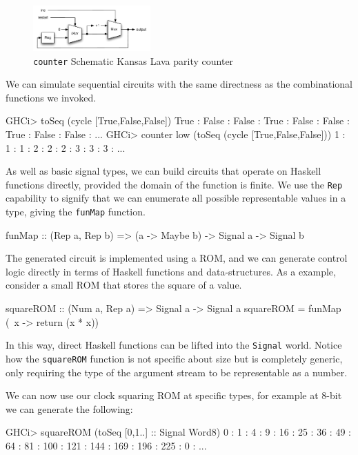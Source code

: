 \documentclass[11pt]{article}
\begin{document}
\begin{figure}[!t]
  \centering         
    \includegraphics[width=0.4\textwidth]{images/Counter.pdf}
  \caption{{\tt counter} Schematic Kansas Lava parity counter}
  \label{fig:counter-picture}
\end{figure}


We can simulate sequential circuits with the
same directness as the combinational functions we invoked.
\begin{Code}
GHCi> toSeq (cycle [True,False,False])
True : False : False : True : False : False : True : False : False : ...
GHCi> counter low (toSeq (cycle [True,False,False]))
1 : 1 : 1 : 2 : 2 : 2 : 3 : 3 : 3 : ...
\end{Code}

As well as basic signal types,
we can build circuits that operate on Haskell
functions directly, provided the domain of the
function is finite. We use the \verb|Rep|
capability to signify that we can enumerate
all possible representable values in a type,
giving the \verb|funMap| function.
\begin{Code}
funMap :: (Rep a, Rep b) => (a -> Maybe b) -> Signal a -> Signal b
\end{Code}
The generated circuit is implemented using a ROM,
and we can generate control logic
directly in terms of Haskell functions
and data-structures. As a example, consider
a small ROM that stores the square of a
value.
\begin{Code}
squareROM :: (Num a, Rep a) => Signal a -> Signal a
squareROM = funMap (\ x -> return (x * x))
\end{Code}
In this way, direct Haskell functions
can be lifted into the \verb|Signal| world.
Notice how the \verb|squareROM| function is
not specific about size but is
completely generic, only requiring the
type of the argument stream
to be representable as a number.

We can now use our clock squaring ROM at specific types,
for example at 8-bit we can generate the following:
\begin{Code}
GHCi> squareROM (toSeq [0,1..] :: Signal Word8)        
0 : 1 : 4 : 9 : 16 : 25 : 36 : 49 : 64 : 81 : 100 : 121 : 144 : 169 : 196 : 225 : 0 : ...
\end{Code}
\end{document}
